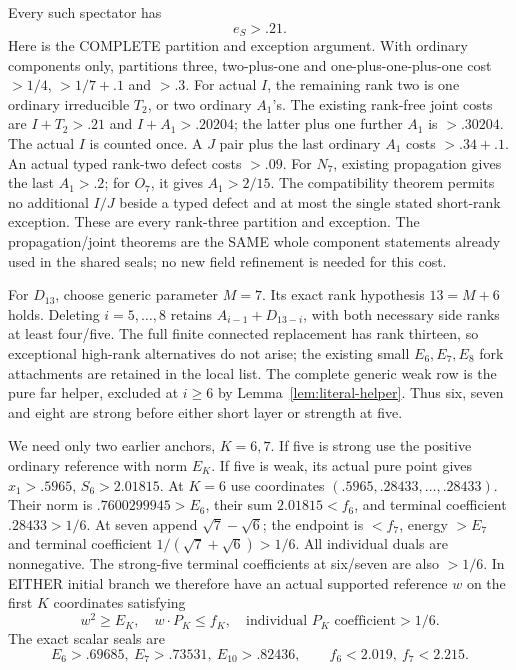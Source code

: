 Every such spectator has
\[
                                e_S>.21 .
\tag{S3}\label{eq:arithD13spectator}
\]
Here is the COMPLETE partition and exception argument.
With ordinary components only, partitions three,
two-plus-one and one-plus-one-plus-one cost
\(>1/4\), \(>1/7+.1\) and \(>.3\).
For actual \(I\), the remaining rank two is one
ordinary irreducible \(T_2\), or two ordinary \(A_1\)'s.
The existing rank-free joint costs are
\(I+T_2>.21\) and \(I+A_1>.20204\);
the latter plus one further \(A_1\) is \(>.30204\).
The actual \(I\) is counted once.
A \(J\) pair plus the last ordinary \(A_1\)
costs \(>.34+.1\).
An actual typed rank-two defect costs \(>.09\).
For \(N_7\), existing propagation gives the last
\(A_1>.2\); for \(O_7\), it gives \(A_1>2/15\).
The compatibility theorem permits no additional
\(I/J\) beside a typed defect and at most the
single stated short-rank exception.
These are every rank-three partition and exception.
The propagation/joint theorems are the SAME whole
component statements already used in the shared seals;
no new field refinement is needed for this cost.

For \(D_{13}\), choose generic parameter \(M=7\).
Its exact rank hypothesis \(13=M+6\) holds.
Deleting \(i=5,\ldots,8\) retains
\(A_{i-1}+D_{13-i}\), with both necessary side
ranks at least four/five.
The full finite connected replacement has rank
thirteen, so exceptional high-rank alternatives
do not arise; the existing small \(E_6,E_7,E_8\)
fork attachments are retained in the local list.
The complete generic weak row is the pure far
helper, excluded at \(i\ge6\) by
Lemma~\ref{lem:literal-helper}.
Thus six, seven and eight are strong before
either short layer or strength at five.

We need only two earlier anchors, \(K=6,7\).
If five is strong use the positive ordinary
reference with norm \(E_K\).
If five is weak, its actual pure point gives
\(x_1>.5965\), \(S_6>2.01815\).
At \(K=6\) use coordinates
\((.5965,.28433,\ldots,.28433)\).
Their norm is \(.7600299945>E_6\), their sum
\(2.01815<f_6\), and terminal coefficient
\(.28433>1/6\).
At seven append \(\sqrt7-\sqrt6\);
the endpoint is \(<f_7\), energy \(>E_7\)
and terminal coefficient
\(1/(\sqrt7+\sqrt6)>1/6\).
All individual duals are nonnegative.
The strong-five terminal coefficients at six/seven
are also \(>1/6\).
In EITHER initial branch we therefore have an
actual supported reference \(w\) on the first \(K\)
coordinates satisfying
\[
 w^2\ge E_K,\quad w\cdot P_K\le f_K,\quad
        \text{individual }P_K\text{ coefficient}>1/6 .
\]
The exact scalar seals are
\[
 E_6>.69685,\ E_7>.73531,\ E_{10}>.82436,\qquad
 f_6<2.019,\ f_7<2.215.
\]

